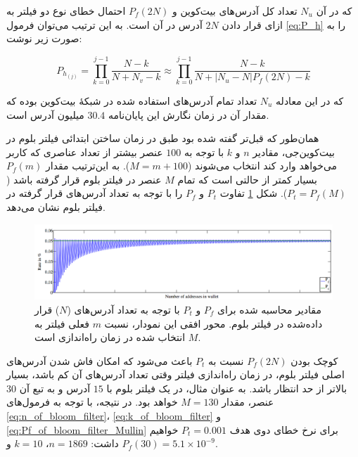  که در آن $N_u$ تعداد کل آدرس‌های بیت‌کوین و $P_f(2N)$ احتمال خطای نوع دو فیلتر به ازای قرار دادن $2N$ آدرس در آن است. به این ترتیب می‌توان فرمول \eqref{eq:P_h} را به صورت زیر نوشت:
 
  \begin{equation}
 \label{eq:P_h_estimation}
 P_{h_{(j)}} = \prod_{k=0}^{j-1}\frac{N-k}{N+N_v-k} \approx \prod_{k=0}^{j-1}\frac{N-k}{N+|N_u-N|P_f(2N)-k}
 \end{equation}

که در این معادله $N_u$ تعداد تمام آدرس‌های استفاده شده در شبکهٔ بیت‌کوین بوده که مقدار آن در زمان نگارش این پایان‌نامه $30.4$ میلیون آدرس است.

همان‌طور که قبل‌تر گفته شده بود طبق \cite{Gervais2014} در زمان ساختن ابتدائی فیلتر بلوم در بیت‌کوین‌جی، مقادیر $n$ و $k$ با توجه به $100$ عنصر بیشتر از تعداد عناصری که کاربر می‌خواهد وارد کند انتخاب می‌شوند ($M=m+100$). به این‌ترتیب مقدار $P_f(m)$ بسیار کمتر از حالتی است که تمام $M$ عنصر در فیلتر بلوم قرار گرفته باشد ($P_t = P_f(M)$). شکل \ref{fig:ptvspf} تفاوت $P_t$ و $P_f$ را با توجه به تعداد آدرس‌های قرار گرفته در فیلتر بلوم نشان می‌دهد. 

\begin{figure}
	\centering
	\includegraphics[width=\linewidth]{image/Pt_vs_Pf}
	\caption{
		مقادیر محاسبه شده برای $P_f$ و $P_t$ با توجه به تعداد آدرس‌های ($N$) قرار داده‌شده در فیلتر بلوم. محور افقی این نمودار، نسبت $m$ فعلی فیلتر به $M$ انتخاب شده در زمان راه‌اندازی است.
		\cite{Gervais2014}}
	\label{fig:ptvspf}
\end{figure}

کوچک بودن 
$P_f(2N)$
نسبت به  
$P_t$
باعث می‌شود که امکان فاش شدن آدرس‌های اصلی فیلتر بلوم، در زمان راه‌اندازی فیلتر وقتی تعداد آدرس‌های آن کم باشد، بسیار بالاتر از حد انتظار باشد. به عنوان مثال، در یک فیلتر بلوم با $15$ آدرس و به تبع آن $30$ عنصر، مقدار $M=130$ خواهد بود. در نتیجه، با توجه به فرمول‌های 
\eqref{eq:n_of_bloom_filter}،
\eqref{eq:k_of_bloom_filter} و
\eqref{eq:Pf_of_bloom_filter_Mullin}
 برای نرخ خطای دوی هدف
$P_t=0.001$
 خواهیم داشت:
$n=1869$،
$k=10$ و
$P_f(30)=5.1\times10^{-9}$.


